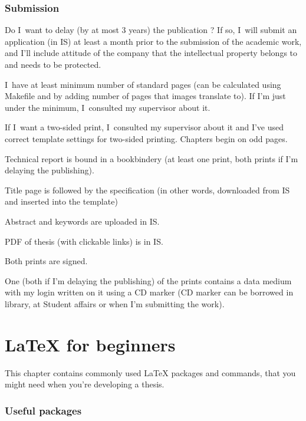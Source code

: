 \subsection*{Submission}
\begin{checklist}
	\item Do I~want to delay (by at most 3 years) the publication ? If so, I~will submit an application (in IS) at least a month prior to the submission of the academic work, and I'll include attitude of the company that the intellectual property belongs to and needs to be protected.
    \item I~have at least minimum number of standard pages (can be calculated using Makefile and by adding number of pages that images translate to). If I'm just under the minimum, I~consulted my supervisor about it.
   	\item If I~want a two-sided print, I~consulted my supervisor about it and I've used correct template settings for two-sided printing. Chapters begin on odd pages.
    \item Technical report is bound in a bookbindery (at least one print, both prints if I'm delaying the publishing).
    \item Title page is followed by the specification (in other words, downloaded from IS and inserted into the template)
    \item Abstract and keywords are uploaded in IS.
    \item PDF of thesis (with clickable links) is in IS.
    \item Both prints are signed.
    \item One (both if I'm delaying the publishing) of the prints contains a data medium with my login written on it using a CD marker (CD marker can be borrowed in library, at Student affairs or when I'm submitting the work).
\end{checklist}

\chapter{\LaTeX{} for beginners}
\label{latex}

This chapter contains commonly used \LaTeX{} packages and commands, that you might need when you're developing a thesis.

\subsection*{Useful packages}

